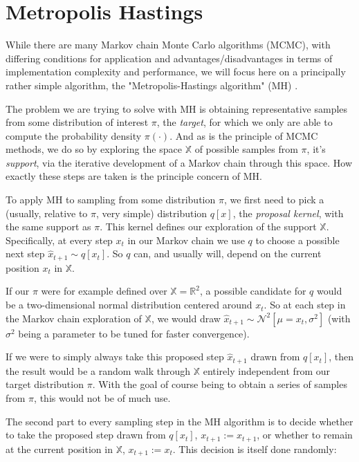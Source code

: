 \section{Metropolis Hastings}

While there are many Markov chain Monte Carlo algorithms (MCMC), with differing conditions for application and advantages/disadvantages in terms of implementation complexity and performance, we will focus here on a principally rather simple algorithm, the "Metropolis-Hastings algorithm" (MH) \cite{metropolis1953equation} \cite{hastings1970monte}.

The problem we are trying to solve with MH is obtaining representative samples from some distribution of interest $\pi$, the \textit{target}, for which we only are able to compute the probability density $\pi(\cdot)$. And as is the principle of MCMC methods, we do so by exploring the space $\mathbb{X}$ of possible samples from $\pi$, it's \textit{support}, via the iterative development of a Markov chain through this space. How exactly these steps are taken is the principle concern of MH.

To apply MH to sampling from some distribution $\pi$, we first need to pick a (usually, relative to $\pi$, very simple) distribution $q[x]$, the \textit{proposal kernel}, with the same support as $\pi$. This kernel defines our exploration of the support $\mathbb{X}$. Specifically, at every step $x_t$ in our Markov chain we use $q$ to choose a possible next step $\hat{x}_{t+1} \sim q[x_t]$. So $q$ can, and usually will, depend on the current position $x_t$ in $\mathbb{X}$.

If our $\pi$ were for example defined over $\mathbb{X} = \mathbb{R}^2$, a possible candidate for $q$ would be a two-dimensional normal distribution centered around $x_t$. So at each step in the Markov chain exploration of $\mathbb{X}$, we would draw $\hat{x}_{t+1} \sim \mathcal{N}^2[\mu = x_t, \sigma^2]$ (with $\sigma^2$ being a parameter to be tuned for faster convergence).

If we were to simply always take this proposed step $\hat{x}_{t+1}$ drawn from $q[x_t]$, then the result would be a random walk through $\mathbb{X}$ entirely independent from our target distribution $\pi$. With the goal of course being to obtain a series of samples from $\pi$, this would not be of much use.

The second part to every sampling step in the MH algorithm is to decide whether to take the proposed step drawn from $q[x_t]$, $x_{t+1} := \hat{x}_{t+1}$, or whether to remain at the current position in $\mathbb{X}$, $x_{t+1} := x_t$. This decision is itself done randomly:

